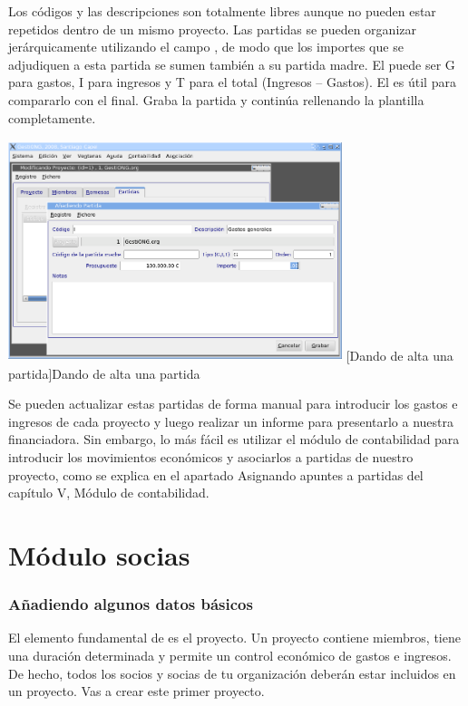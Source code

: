 Los códigos y las descripciones son totalmente libres aunque no pueden
estar repetidos dentro de un mismo proyecto. Las partidas se pueden
organizar jerárquicamente utilizando el campo
, de modo que los
importes que se adjudiquen a esta partida se sumen también a su
partida madre. El puede ser G para gastos, I
para ingresos y T para el total (Ingresos -- Gastos). El
 es útil para compararlo con el
 final. Graba la partida y continúa
rellenando la plantilla completamente.

\begin{center}
\includegraphics[width=9.738cm,height=6.452cm]{manual-img22.png}
[Dando de alta una partida]{Dando de alta una partida}

\end{center}
Se pueden actualizar estas partidas de forma manual para introducir los
gastos e ingresos de cada proyecto y luego realizar un informe para
presentarlo a nuestra financiadora. Sin embargo, lo más fácil es
utilizar el módulo de contabilidad para introducir los movimientos
económicos y asociarlos a partidas de nuestro proyecto, como se
explica en el apartado Asignando apuntes a partidas del capítulo V,
Módulo de contabilidad.

\chapter{Módulo socias}

\subsection{Añadiendo algunos datos básicos}
\label{ref:aadiendoalgunosdatosbasico}El elemento fundamental de
\appname es el proyecto. Un proyecto contiene miembros, tiene una
duración determinada y permite un control económico de gastos e
ingresos. De hecho, todos los socios y socias de tu organización
deberán estar incluidos en un proyecto. Vas a crear este primer
proyecto.

